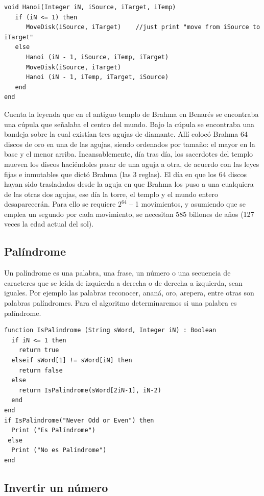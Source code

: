 \begin{lstlisting}[upquote=true, language=pseudo]
void Hanoi(Integer iN, iSource, iTarget, iTemp)
   if (iN <= 1) then
      MoveDisk(iSource, iTarget)	//just print "move from iSource to iTarget"
   else
      Hanoi (iN - 1, iSource, iTemp, iTarget)
      MoveDisk(iSource, iTarget)
      Hanoi (iN - 1, iTemp, iTarget, iSource)
   end
end
\end{lstlisting}

Cuenta la leyenda que en el antiguo templo de Brahma en Benarés se encontraba una cúpula que señalaba el centro del mundo. Bajo la cúpula se encontraba una bandeja sobre la cual existían tres agujas de diamante. Allí colocó Brahma 64 discos de oro en una de las agujas, siendo ordenados por tamaño: el mayor en la base y el menor arriba. Incansablemente, día tras día, los sacerdotes del templo mueven los discos haciéndoles pasar de una aguja a otra, de acuerdo con las leyes fijas e inmutables que dictó Brahma (las 3 reglas). El día en que los 64 discos hayan sido trasladados desde la aguja en que Brahma los puso a una cualquiera de las otras dos agujas, ese día la torre, el templo y el mundo entero desaparecerán. Para ello se requiere $2^{64}$ – 1 movimientos, y asumiendo que se emplea un segundo por cada movimiento, se necesitan 585 billones de años (127 veces la edad actual del sol).

\subsection{Palíndrome}

Un palíndrome es una palabra, una frase, un número o una secuencia de caracteres que se leída de izquierda a derecha o de derecha a izquierda, sean iguales. Por ejemplo las palabras reconocer, ananá, oro, arepera, entre otras son palabras palíndromes. Para el algoritmo determinaremos si una palabra es palíndrome.

\begin{lstlisting}[upquote=true, language=pseudo]
function IsPalindrome (String sWord, Integer iN) : Boolean
  if iN <= 1 then 
    return true
  elseif sWord[1] != sWord[iN] then
    return false
  else
    return IsPalindrome(sWord[2iN-1], iN-2)
  end
end
if IsPalindrome("Never Odd or Even") then
  Print ("Es Palíndrome")
 else
  Print ("No es Palíndrome")
end
\end{lstlisting}

\subsection{Invertir un número}

